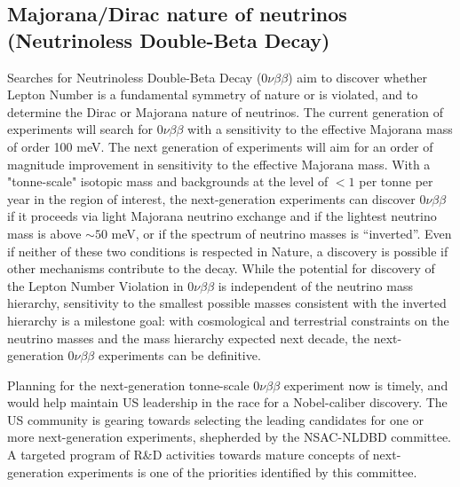 \subsection{Majorana/Dirac nature of neutrinos (Neutrinoless
  Double-Beta Decay)}

Searches for Neutrinoless Double-Beta Decay
($0\nu\beta\beta$) aim to discover whether Lepton Number is a
fundamental symmetry of nature or is violated, and to determine the Dirac or
Majorana nature of neutrinos. The current generation of experiments
will search for $0\nu\beta\beta$  with a sensitivity to the effective Majorana
mass of order 100 meV. The next generation of experiments will aim for
an order of magnitude improvement in sensitivity to the effective
Majorana mass. With a "tonne-scale" isotopic mass and backgrounds at
the level of $<1$ per tonne per year in the region of interest, the
next-generation experiments  can  discover
$0\nu\beta\beta$ if it proceeds via light Majorana neutrino exchange
and if the lightest neutrino 
mass is above $\sim50$ meV, or if the spectrum of neutrino masses is
``inverted''. Even if neither of these two conditions is respected in
Nature, a discovery is possible if other mechanisms contribute to the
decay. While the potential for discovery of the Lepton Number
Violation in $0\nu\beta\beta$ is independent of the neutrino mass
hierarchy, sensitivity to the smallest possible masses consistent with
the inverted hierarchy is a milestone goal: with cosmological and
terrestrial constraints on the neutrino masses and the mass hierarchy
expected next decade, the next-generation  $0\nu\beta\beta$
experiments can be definitive.  

Planning for the next-generation tonne-scale  $0\nu\beta\beta$
experiment now is timely, and would help maintain US leadership in
the race for a Nobel-caliber discovery. The US community is
gearing towards selecting the 
leading candidates for one or more next-generation experiments,
shepherded by the NSAC-NLDBD committee. 
A targeted program of R\&D
activities towards mature concepts of next-generation experiments
is one of the priorities identified by this committee. 

